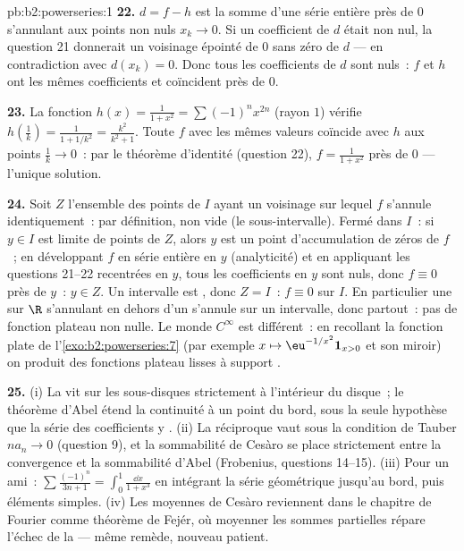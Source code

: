 \begin{solution}{pb:b2:powerseries:1}
\textbf{22.} $d = f - h$ est la somme d'une série entière près de $0$
s'annulant aux points non nuls $x_k \to 0$. Si un
coefficient de $d$ était non nul, la question 21 donnerait un
voisinage épointé de $0$ sans zéro de $d$ ---
en contradiction avec $d(x_k) = 0$. Donc tous les coefficients de $d$ sont nuls~:
$f$ et $h$ ont les mêmes coefficients et coïncident près de $0$.

\textbf{23.} La fonction $h(x) = \frac{1}{1+x^2} =
\sum(-1)^nx^{2n}$ (rayon $1$) vérifie $h(\frac1k) =
\frac{1}{1 + 1/k^2} = \frac{k^2}{k^2+1}$. Toute $f$  avec
les mêmes valeurs coïncide avec $h$ aux points $\frac1k \to 0$~:
par le théorème d'identité (question 22), $f = \frac{1}{1+x^2}$
près de $0$ --- l'unique solution.

\textbf{24.} Soit $Z$ l'ensemble des points de $I$ ayant un
voisinage sur lequel $f$ s'annule identiquement~:  par
définition, non vide (le sous-intervalle). Fermé dans $I$~: si $y
\in I$ est limite de points de $Z$, alors $y$ est un point
d'accumulation de zéros de $f$~; en développant $f$ en série entière en $y$
(analyticité) et en appliquant les questions 21--22 recentrées en $y$,
tous les coefficients en $y$ sont nuls, donc $f \equiv 0$ près de $y$~: $y
\in Z$. Un intervalle est , donc $Z = I$~: $f \equiv 0$ sur
$I$. En particulier une  sur $\R$ s'annulant
en dehors d'un  s'annule sur un intervalle, donc
partout~: pas de fonction plateau  non nulle. Le monde $C^\infty$ est
différent~: en recollant la fonction plate de
l'\cref{exo:b2:powerseries:7} (par exemple $x \mapsto
\eu^{-1/x^2}\mathbf 1_{x>0}$ et son miroir) on produit des fonctions plateau
lisses à support .

\textbf{25.} (i) La  vit sur les sous-disques 
strictement à l'intérieur du disque~; le théorème d'Abel étend la continuité à
un point du bord, sous la seule hypothèse que la série des
coefficients y . (ii) La réciproque vaut
sous la condition de Tauber $na_n \to 0$ (question 9), et
la sommabilité de Cesàro se place strictement entre la convergence et
la sommabilité d'Abel (Frobenius, questions 14--15). (iii) Pour un
ami~: $\sum\frac{(-1)^n}{3n+1} = \int_0^1\frac{\dd x}{1+x^3}$
en intégrant la série géométrique jusqu'au bord, puis
éléments simples. (iv) Les moyennes de Cesàro reviennent dans le chapitre de
Fourier comme théorème de Fejér, où moyenner les sommes
partielles répare l'échec de la  --- même remède,
nouveau patient.
\end{solution}

